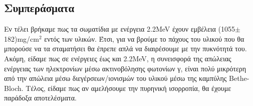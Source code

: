 \documentclass[a4paper]{article}
\begin{document}
\subsection*{Συμπεράσματα}
	Εν τέλει βρήκαμε πως τα σωματίδια με ενέργεια 2.2MeV έχουν εμβέλεια (1055$\pm$182)mg/cm$^2$ εντός των υλικών. Έτσι, για να βρούμε το πάχους του υλικού που θα μπορούσε να τα σταματήσει θα έπρεπε απλά να διαιρέσουμε με την πυκνότητά του.
	Ακόμη, είδαμε πως σε ενέργειες έως και 2.2MeV, η συνεισφορά της απώλειας ενέργειας των ηλεκτρονίων μέσω ακτινοβόλησης φωτονίων γ, είναι πολύ μικρότερη από την απώλεια μέσω διεγέρσεων/ιονισμών του υλικού μέσω της καμπύλης Bethe-Bloch.
	Τέλος, είδαμε πως αν αμελήσουμε την πυρηνική ισορροπία, θα έχουμε παράδοξα αποτελέσματα.
	
	
\end{document}
